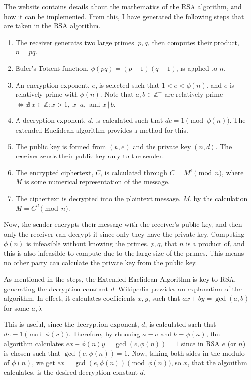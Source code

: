\documentclass[../main.tex]{subfiles}
\begin{document}
The website \cite{RSAgfg} contains details about the mathematics of the RSA algorithm, and how it can be implemented. From this, I have generated the following steps that are taken in the RSA algorithm.
\begin{enumerate}
    \item The receiver generates two large primes, $p,q$, then computes their product, $n = pq$.
    \item Euler’s Totient function, $\phi(pq) = (p-1)(q-1)$, is applied to $n$.
    \item An encryption exponent, $e$, is selected such that $1 < e < \phi(n)$, and $e$ is relatively prime with $\phi(n)$. Note that $a,b \in \mathbb{Z}^+$ are relatively prime $\iff \nexists\ x \in \mathbb{Z} : x > 1,\ x\,|\,a,$ and $x\,|\,b$.
    \item A decryption exponent, $d$, is calculated such that $de = 1 \pmod{\phi(n)}$. The extended Euclidean algorithm provides a method for this.
    \item The public key is formed from $(n,e)$ and the private key $(n,d)$. The receiver sends their public key only to the sender. 
    \item The encrypted ciphertext, $C$, is calculated through $C = M^e \pmod n$, where $M$ is some numerical representation of the message. 
    \item The ciphertext is decrypted into the plaintext message, $M$, by the calculation $M = C^d \pmod n$.
\end{enumerate}

Now, the sender encrypts their message with the receiver’s public key, and then only the receiver can decrypt it since only they have the private key. Computing $\phi(n)$ is infeasible without knowing the primes, $p,q$, that $n$ is a product of, and this is also infeasible to compute due to the large size of the primes. This means no other party can calculate the private key from the public key.

As mentioned in the steps, the Extended Euclidean Algorithm is key to RSA, generating the decryption constant $d$. Wikipedia \cite{EEAWiki} provides an explanation of the algorithm. In effect, it calculates coefficients $x, y$, such that $ax + by = \gcd(a,b)$ for some $a, b$.

This is useful, since the decryption exponent, $d$, is calculated such that $de = 1 \pmod{\phi(n)}$. Therefore, by choosing $a = e$ and $b = \phi(n)$, the algorithm calculates $ex + \phi(n)y = \gcd(e, \phi(n)) = 1$ since in RSA $e$ (or $n$) is chosen such that $\gcd(e, \phi(n)) = 1$. Now, taking both sides in the modulo of $\phi(n)$, we get $ex = \gcd(e, \phi(n)) \pmod{\phi(n)}$, so $x$, that the algorithm calculates, is the desired decryption constant $d$.
\end{document}
